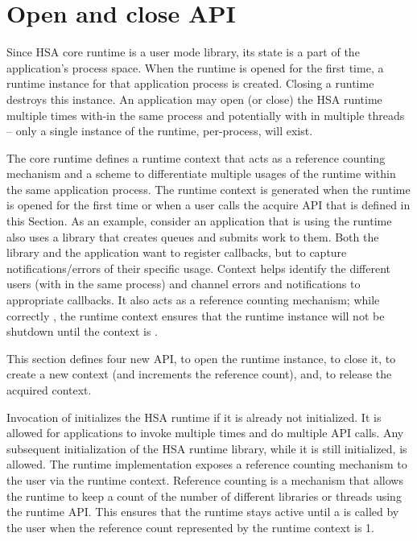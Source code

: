 \begin{DIFnomarkup}
\hypertarget{init}{}\section{Open and close
API}\label{init}
\end{DIFnomarkup}

Since HSA core runtime is a user mode library, its state is a part
of the application's process space. When the runtime is opened for
the first time, a runtime instance for that application process is
created. Closing a runtime destroys this instance. An application
may open (or close) the HSA runtime multiple times with-in the same
process and potentially with in multiple threads -- only a
single instance of the runtime, per-process, will exist. 

The core runtime defines a runtime context that acts as a reference
counting mechanism and a scheme to differentiate multiple usages of
the runtime within the same application process. The runtime context
is generated when the runtime is opened for the first time or when a
user calls the acquire API that is defined in this Section. As an
example, consider an application that is using the runtime also uses
a library that creates queues and submits work to them. Both the
library and the application want to register callbacks, but to
capture notifications/errors of their specific usage. Context helps
identify the different users (with in the same process) and channel
errors and notifications to appropriate callbacks. It also acts as a
reference counting mechanism; while correctly , the
runtime context ensures that the runtime instance will not be
shutdown until the context is .

This section defines four new API,  to open the
runtime instance,  to close it,
 to create a new context (and increments the
reference count), and,
 to release the acquired context.

Invocation of  initializes the HSA runtime if it is
already not initialized. It is allowed for applications to invoke
 multiple times and do multiple 
API calls. Any subsequent initialization of the HSA runtime library,
while it is still initialized, is allowed. The runtime
implementation exposes a reference counting mechanism to the user
via the runtime context. Reference counting is a mechanism that
allows the runtime to keep a count of the number of different
libraries or threads using the runtime API.  This ensures that the
runtime stays active until a  is called by the user
when the reference count represented by the runtime context is 1.

